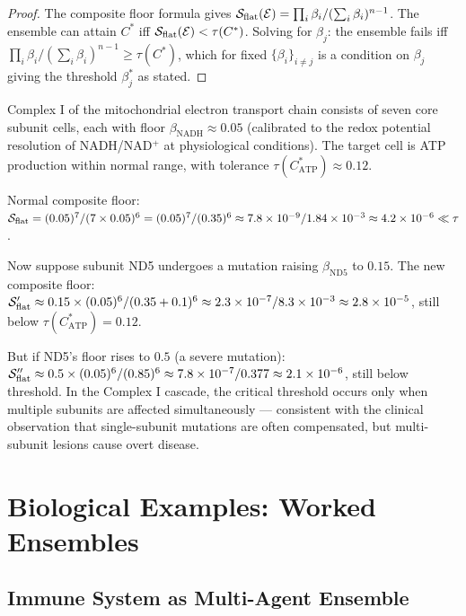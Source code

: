 \begin{proof}
The composite floor formula gives
$\mathcal{S}_{\mathrm{flat}}(\mathcal{E}) = \prod_i \beta_i / (\sum_i \beta_i)^{n-1}$.
The ensemble can attain $C^*$ iff $\mathcal{S}_{\mathrm{flat}}(\mathcal{E}) < \tau(C^*)$.
Solving for $\beta_j$: the ensemble fails iff
$\prod_i \beta_i / (\sum_i \beta_i)^{n-1} \geq \tau(C^*)$, which for fixed
$\{\beta_i\}_{i \neq j}$ is a condition on $\beta_j$ giving the threshold
$\beta_j^*$ as stated.
\end{proof}

\begin{example}
\label{ex:mito-cascade}
Complex I of the mitochondrial electron transport chain consists of seven core
subunit cells, each with floor $\beta_{\mathrm{NADH}} \approx 0.05$ (calibrated
to the redox potential resolution of NADH/NAD$^+$ at physiological conditions).
The target cell is ATP production within normal range, with tolerance
$\tau(C^*_{\mathrm{ATP}}) \approx 0.12$.

Normal composite floor:
$\mathcal{S}_{\mathrm{flat}} = (0.05)^7 / (7 \times 0.05)^6 = (0.05)^7 / (0.35)^6
\approx 7.8 \times 10^{-9} / 1.84 \times 10^{-3} \approx 4.2 \times 10^{-6} \ll \tau$.

Now suppose subunit ND5 undergoes a mutation raising $\beta_{\mathrm{ND5}}$
to $0.15$.  The new composite floor:
$\mathcal{S}_{\mathrm{flat}}' \approx 0.15 \times (0.05)^6 / (0.35 + 0.1)^6
\approx 2.3 \times 10^{-7} / 8.3 \times 10^{-3} \approx 2.8 \times 10^{-5}$,
still below $\tau(C^*_{\mathrm{ATP}}) = 0.12$.

But if ND5's floor rises to $0.5$ (a severe mutation):
$\mathcal{S}_{\mathrm{flat}}'' \approx 0.5 \times (0.05)^6 / (0.85)^6
\approx 7.8 \times 10^{-7} / 0.377 \approx 2.1 \times 10^{-6}$,
still below threshold.  In the Complex I cascade, the critical threshold
occurs only when multiple subunits are affected simultaneously — consistent
with the clinical observation that single-subunit mutations are often
compensated, but multi-subunit lesions cause overt disease.
\end{example}

\section{Biological Examples: Worked Ensembles}
\label{sec:biological-examples}

\subsection{Immune System as Multi-Agent Ensemble}

